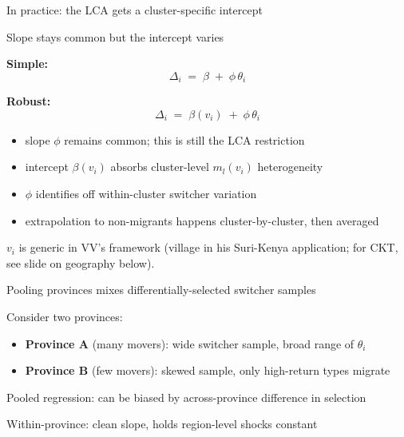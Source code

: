 \documentclass[10pt,aspectratio=169]{beamer}
\newcommand{\thetai}{\theta_{i}}
\newcommand{\Deltai}{\Delta_{i}}
\newcommand{\phicoef}{\phi}
\newcommand{\vii}{v_{i}}
\begin{document}
\begin{frame}{In practice: the LCA gets a cluster-specific intercept}

  Slope stays common but the intercept varies

  \vspace{0.4em}
  \textbf{Simple:}
  \[
    \Deltai \;=\; \beta \;+\; \phicoef\, \thetai
  \]

  \textbf{Robust:}
  \[
    \Deltai \;=\; \beta(\vii) \;+\; \phicoef\, \thetai
  \]

  \begin{itemize}
    \item slope $\phicoef$ remains common; this is still the LCA restriction
    \item intercept $\beta(\vii)$ absorbs cluster-level $m_l(\vii)$ heterogeneity
    \item $\phicoef$ identifies off within-cluster switcher variation
    \item extrapolation to non-migrants happens cluster-by-cluster, then averaged
  \end{itemize}

  $\vii$ is generic in VV's framework (village in his Suri-Kenya application; for CKT, see slide on geography below).

\end{frame}

\begin{frame}{Pooling provinces mixes differentially-selected switcher samples}

  Consider two provinces:

  \begin{itemize}
    \item \textbf{Province A} (many movers): wide switcher sample, broad range of $\thetai$
    \item \textbf{Province B} (few movers): skewed sample, only high-return types migrate
  \end{itemize}

  \vspace{0.6em}
  Pooled regression: can be biased by across-province difference in selection

  Within-province: clean slope, holds region-level shocks constant

\end{frame}
\end{document}
